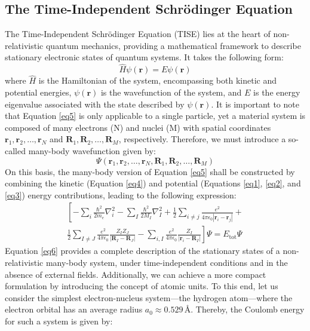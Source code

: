 \subsection{The Time-Independent Schrödinger Equation}
The Time-Independent Schrödinger Equation (TISE) lies at the heart of non-relativistic quantum mechanics, providing a mathematical framework to describe stationary electronic states of quantum systems. It takes the following form:
\begin{equation}
  \label{eq5}
  \hat{H} \psi(\mathbf{r}) = E \psi(\mathbf{r})
\end{equation}
where $\hat{H}$ is the Hamiltonian of the system, encompassing both kinetic and potential energies, $\psi(\mathbf{r})$ is the wavefunction of the system, and $E$ is the energy eigenvalue associated with the state described by $\psi(\mathbf{r})$.  It is important to note that Equation \ref{eq5} is only applicable to a single particle, yet a material system is composed of many electrons (N) and nuclei (M) with spatial coordinates $\mathbf{r}_1, \mathbf{r}_2, \ldots, \mathbf{r}_N$ and $\mathbf{R}_1, \mathbf{R}_2, \ldots, \mathbf{R}_M$, respectively. Therefore, we must introduce a so-called many-body wavefunction given by:
\begin{equation}
  \Psi(\mathbf{r}_1, \mathbf{r}_2, \ldots, \mathbf{r}_N, \mathbf{R}_1, \mathbf{R}_2, \ldots, \mathbf{R}_M)
  \label{eq5b}
\end{equation}
On this basis, the many-body version of Equation \ref{eq5} shall be constructed by combining the kinetic (Equation \ref{eq4}) and potential (Equations \ref{eq1}, \ref{eq2}, and \ref{eq3}) energy contributions, leading to the following expression:
\begin{equation}
  \label{eq6}
  \begin{split}
    \left[
      -\sum_i \frac{\hbar^2}{2m_e} \nabla_i^2 
      - \sum_I \frac{\hbar^2}{2M_I} \nabla_I^2 
      + \frac{1}{2} \sum_{i\neq j} \frac{e^2}{4\pi\epsilon_0 |\mathbf{r}_i - \mathbf{r}_j|} +\right. \\
      \left. \frac{1}{2} \sum_{I\neq J} \frac{e^2}{4\pi\epsilon_0} \frac{Z_I Z_J}{|\mathbf{R}_I - \mathbf{R}_J|} 
      - \sum_{i, I} \frac{e^2}{4\pi\epsilon_0} \frac{Z_I}{|\mathbf{r}_i - \mathbf{R}_I|}
    \right]\Psi = E_{\text{tot}} \Psi
  \end{split}
\end{equation}
Equation \ref{eq6} provides a complete description of the stationary states of a non-relativistic many-body system, under time-independent conditions and in the absence of external fields. Additionally, we can achieve a more compact formulation by introducing the concept of atomic units. To this end, let us consider the simplest electron-nucleus system---the hydrogen atom---where the electron orbital has an average radius $a_0 \approx 0.529 \, \text{Å}$. Thereby, the Coulomb energy for such a system is given by:
